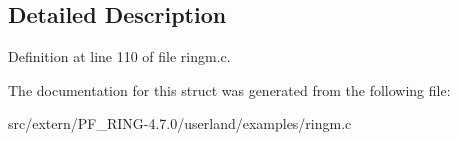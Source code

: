 \subsection{Detailed Description}


Definition at line 110 of file ringm.c.



The documentation for this struct was generated from the following file:\begin{DoxyCompactItemize}
\item 
src/extern/PF\_\-RING-\/4.7.0/userland/examples/ringm.c\end{DoxyCompactItemize}
